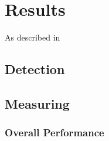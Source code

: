 \chapter{Results} \label{results}
As described in 
%
%



\section{Detection}










\section{Measuring}












\subsection{Overall Performance}









